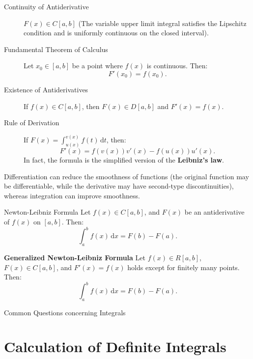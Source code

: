 \documentclass[11pt]{../../TexTemplate/elegantbook}
\begin{document}
\begin{property}
    \begin{description}
        \item [Continuity of Antiderivative]  \( F(x) \in C[a, b] \) (The variable upper limit integral satisfies the 
            Lipschitz condition and is uniformly continuous on the closed interval).
        \item [Fundamental Theorem of Calculus] Let \( x_0 \in [a, b] \) be a point where \( f(x) \) is continuous. Then:
            \[
            F'(x_0) = f(x_0).
            \]
        \item [Existence of Antiderivatives] If \( f(x) \in C[a, b] \), then \( F(x) \in D[a, b] \) and \( F'(x) = f(x) \).
        \item [Rule of Derivation] If \( F(x) = \int_{u(x)}^{v(x)} f(t) \, \mathrm{d}t \), then:
            \[
            F'(x) = f(v(x))v'(x) - f(u(x))u'(x).
            \]
            In fact, the formula is the simplified version of the \textbf{Leibniz's law}.
    \end{description}
\end{property}


\begin{remark}
        Differentiation can reduce the smoothness of functions (the original function may be differentiable, 
        while the derivative may have second-type discontinuities), whereas integration can improve smoothness.
\end{remark}

\begin{theorem}{Newton-Leibniz Formula}
    Let \( f(x) \in C[a, b] \), and \( F(x) \) be an antiderivative of \( f(x) \) on \( [a, b] \). Then:
    \[
    \int_{a}^{b} f(x) \, \mathrm{d}x = F(b) - F(a).
    \]

    \textbf{Generalized Newton-Leibniz Formula}
    Let \( f(x) \in R[a, b] \), \( F(x) \in C[a, b] \), and \( F'(x) = f(x) \) holds except for finitely many points. 
    Then:
    \[
    \int_{a}^{b} f(x) \, \mathrm{d}x = F(b) - F(a).
    \]
\end{theorem}



\begin{leftbarTitle}{Common Questions concerning Integrals}\end{leftbarTitle}

\section{Calculation of Definite Integrals}
\end{document}
